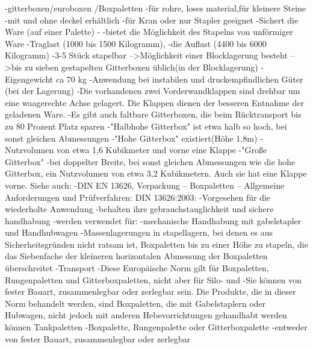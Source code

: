         -gitterboxen/euroboxen /Boxpaletten
            -für rohre, loses material,für kleinere Steine
            -mit und ohne deckel erhältlich
            -für Kran oder nur Stapler geeignet
            -Sichert die Ware (auf einer Palette)
            -%
            -bietet die Möglichkeit des Stapelns von unförmiger Ware
            -Traglast (1000 bis 1500 Kilogramm),
            -die Auflast (4400 bis 6000 Kilogramm)
            -3-5 Stück stapelbar
            -->Möglichkeit einer Blocklagerung besteht
                -->bis zu sieben gestapelten Gitterboxen üblich(in der Blocklagerung)
            -Eigengewicht ca 70 kg
            -Anwendung bei instabilen und druckempfindlichen Güter (bei der Lagerung)
            -Die vorhandenen zwei Vorderwandklappen sind drehbar um eine waagerechte Achse gelagert. Die Klappen dienen der besseren Entnahme der geladenen Ware.
            -Es gibt auch faltbare Gitterboxen, die beim Rücktransport bis zu 80 Prozent Platz sparen
            -"Halbhohe Gitterbox" ist etwa halb so hoch, bei sonst gleichen Abmessungen
            -"Hohe Gitterbox" existiert(Höhe 1,8m)
                - Nutzvolumen von etwa 1,6 Kubikmeter und vorne eine Klappe
            -"Große Gitterbox"
                -bei doppelter Breite, bei sonst gleichen Abmessungen wie die hohe Gitterbox, ein Nutzvolumen von etwa 3,2 Kubikmetern. Auch sie hat eine Klappe vorne.
        Siehe auch:
            -DIN EN 13626, Verpackung – Boxpaletten – Allgemeine Anforderungen und Prüfverfahren:
            DIN 13626:2003:
                -Vorgesehen für die wiederholte Anwendung
                -behalten ihre gebrauchstauglichkeit und sichere handhabung
                -werden verwendet für: 
                    -mechanische Handhabung mit gabelstapler und Handhubwagen
                    -Massenlagerungen in stapellagern, bei denen es aus Sicherheitsgründen nicht ratsam ist, Boxpaletten bis zu einer Höhe zu stapeln, die das Siebenfache der kleineren horizontalen Abmessung der Boxpaletten überschreitet
                    -Transport
                -Diese Europäische Norm gilt für Boxpaletten, Rungenpaletten und Gitterboxpaletten, nicht aber für Silo- und
                -Sie können von fester Bauart, zusammenlegbar oder zerlegbar sein. Die Produkte, die in dieser Norm behandelt werden, sind Boxpaletten, die mit Gabelstaplern oder Hubwagen, nicht jedoch mit anderen Hebevorrichtungen gehandhabt werden können Tankpaletten
                -Boxpalette, Rungenpalette oder Gitterboxpalette
                    -entweder von fester Bauart, zusammenlegbar oder zerlegbar
